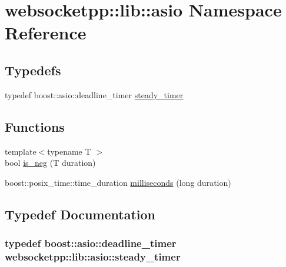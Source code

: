\hypertarget{namespacewebsocketpp_1_1lib_1_1asio}{}\section{websocketpp\+:\+:lib\+:\+:asio Namespace Reference}
\label{namespacewebsocketpp_1_1lib_1_1asio}
\subsection*{Typedefs}
\begin{DoxyCompactItemize}
\item 
typedef boost\+::asio\+::deadline\+\_\+timer \hyperlink{namespacewebsocketpp_1_1lib_1_1asio_a156f3dad489fb17e3bc79d2009d2656f}{steady\+\_\+timer}
\end{DoxyCompactItemize}
\subsection*{Functions}
\begin{DoxyCompactItemize}
\item 
{\footnotesize template$<$typename T $>$ }\\bool \hyperlink{namespacewebsocketpp_1_1lib_1_1asio_a1096d9d4bcff306bf568ba95842142b5}{is\+\_\+neg} (T duration)
\item 
boost\+::posix\+\_\+time\+::time\+\_\+duration \hyperlink{namespacewebsocketpp_1_1lib_1_1asio_a38ce6cba13c37a134a65f3623d00090e}{milliseconds} (long duration)
\end{DoxyCompactItemize}


\subsection{Typedef Documentation}
\hypertarget{namespacewebsocketpp_1_1lib_1_1asio_a156f3dad489fb17e3bc79d2009d2656f}{}
\subsubsection[{steady\+\_\+timer}]{\setlength{\rightskip}{0pt plus 5cm}typedef boost\+::asio\+::deadline\+\_\+timer {\bf websocketpp\+::lib\+::asio\+::steady\+\_\+timer}}\label{namespacewebsocketpp_1_1lib_1_1asio_a156f3dad489fb17e3bc79d2009d2656f}


